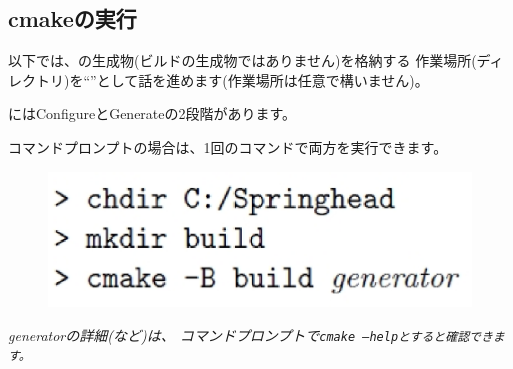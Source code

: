 \subsection{cmakeの実行}
\label{subsec:CmakeLibrary}

\noindent
以下では、\cmake の生成物(ビルドの生成物ではありません)を格納する
作業場所(ディレクトリ)を``\build''として話を進めます(作業場所は任意で構いません)。

\medskip
\noindent
\cmake にはConfigureとGenerateの2段階があります。

\medskip
\noindent
コマンドプロンプトの場合は、1回のコマンドで両方を実行できます。
\ifLwarp
	\begin{figure}[h]
	    \begin{center}
	    \includegraphics[width=\textwidth]{fig/command-2-3.eps}
	    \end{center}
	    \label{fig:DownloadTree}
	\end{figure}
\else
\begin{narrow}[15pt]
	\it{generatorの}詳細(など)は、
	コマンドプロンプトで\tt{cmake --help}とすると確認できます。
\end{narrow}
\fi

